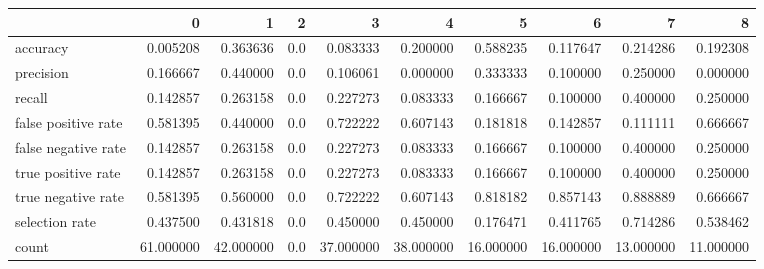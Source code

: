 \begin{tabular}{lrrrrrrrrr}
\toprule
{} &          0 &          1 &    2 &          3 &          4 &          5 &          6 &          7 &          8 \\
\midrule
accuracy            &   0.005208 &   0.363636 &  0.0 &   0.083333 &   0.200000 &   0.588235 &   0.117647 &   0.214286 &   0.192308 \\
precision           &   0.166667 &   0.440000 &  0.0 &   0.106061 &   0.000000 &   0.333333 &   0.100000 &   0.250000 &   0.000000 \\
recall              &   0.142857 &   0.263158 &  0.0 &   0.227273 &   0.083333 &   0.166667 &   0.100000 &   0.400000 &   0.250000 \\
false positive rate &   0.581395 &   0.440000 &  0.0 &   0.722222 &   0.607143 &   0.181818 &   0.142857 &   0.111111 &   0.666667 \\
false negative rate &   0.142857 &   0.263158 &  0.0 &   0.227273 &   0.083333 &   0.166667 &   0.100000 &   0.400000 &   0.250000 \\
true positive rate  &   0.142857 &   0.263158 &  0.0 &   0.227273 &   0.083333 &   0.166667 &   0.100000 &   0.400000 &   0.250000 \\
true negative rate  &   0.581395 &   0.560000 &  0.0 &   0.722222 &   0.607143 &   0.818182 &   0.857143 &   0.888889 &   0.666667 \\
selection rate      &   0.437500 &   0.431818 &  0.0 &   0.450000 &   0.450000 &   0.176471 &   0.411765 &   0.714286 &   0.538462 \\
count               &  61.000000 &  42.000000 &  0.0 &  37.000000 &  38.000000 &  16.000000 &  16.000000 &  13.000000 &  11.000000 \\
\bottomrule
\end{tabular}
